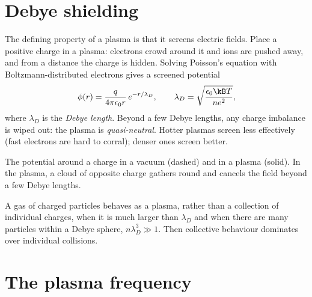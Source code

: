 \section{Debye shielding}

The defining property of a plasma is that it screens electric fields. Place a positive charge in a plasma: electrons crowd around it and ions are pushed away, and from a distance the charge is hidden. Solving Poisson's equation with Boltzmann-distributed electrons gives a screened potential
\[
  \phi(r) = \frac{q}{4\pi\epsilon_0 r}\,e^{-r/\lambda_D}, \qquad \lambda_D = \sqrt{\frac{\epsilon_0\kB T}{ne^2}} ,
\]
where $\lambda_D$ is the \emph{Debye length}. Beyond a few Debye lengths, any charge imbalance is wiped out: the plasma is \emph{quasi-neutral}. Hotter plasmas screen less effectively (fast electrons are hard to corral); denser ones screen better.

\begin{center}
\begin{minipage}{\linewidth}\centering
{}

{\small The potential around a charge in a vacuum (dashed) and in a plasma (solid). In the plasma, a cloud of opposite charge gathers round and cancels the field beyond a few Debye lengths.}
\end{minipage}
\end{center}

A gas of charged particles behaves as a plasma, rather than a collection of individual charges, when it is much larger than $\lambda_D$ and when there are many particles within a Debye sphere, $n\lambda_D^3\gg1$. Then collective behaviour dominates over individual collisions.

\section{The plasma frequency}

